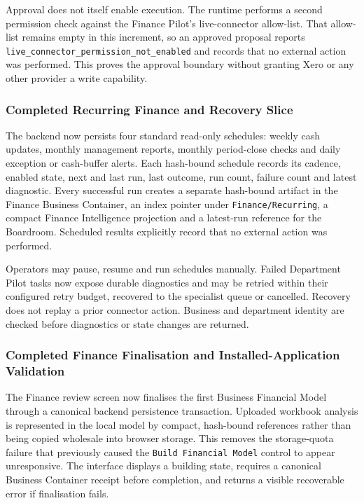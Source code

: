Approval does not itself enable execution.  The runtime performs a second permission check
against the Finance Pilot's live-connector allow-list.  That allow-list remains empty in this
increment, so an approved proposal reports
\texttt{live\_connector\_permission\_not\_enabled} and records that no external action was
performed.  This proves the approval boundary without granting Xero or any other provider a
write capability.

\subsubsection{Completed Recurring Finance and Recovery Slice}

The backend now persists four standard read-only schedules: weekly cash updates, monthly
management reports, monthly period-close checks and daily exception or cash-buffer alerts.
Each hash-bound schedule records its cadence, enabled state, next and last run, last outcome,
run count, failure count and latest diagnostic.  Every successful run creates a separate
hash-bound artifact in the Finance Business Container, an index pointer under
\texttt{Finance/Recurring}, a compact Finance Intelligence projection and a latest-run
reference for the Boardroom.  Scheduled results explicitly record that no external action
was performed.

Operators may pause, resume and run schedules manually.  Failed Department Pilot tasks now
expose durable diagnostics and may be retried within their configured retry budget, recovered
to the specialist queue or cancelled.  Recovery does not replay a prior connector action.
Business and department identity are checked before diagnostics or state changes are returned.

\subsubsection{Completed Finance Finalisation and Installed-Application Validation}

The Finance review screen now finalises the first Business Financial Model through a
canonical backend persistence transaction.  Uploaded workbook analysis is represented in
the local model by compact, hash-bound references rather than being copied wholesale into
browser storage.  This removes the storage-quota failure that previously caused the
\texttt{Build Financial Model} control to appear unresponsive.  The interface displays a
building state, requires a canonical Business Container receipt before completion, and
returns a visible recoverable error if finalisation fails.

